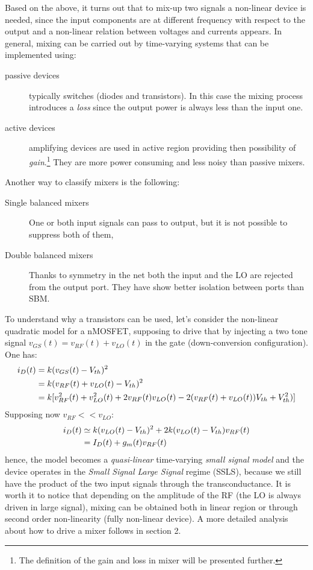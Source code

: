 Based on the above, it turns out that to mix-up two signals a non-linear device is needed, since the input components are at different frequency with respect to the output and a non-linear relation between voltages and currents appears. In general, mixing can be carried out by time-varying systems that can be implemented using:
\begin{description}
	\item [passive devices]	typically switches (diodes and transistors). In this case the mixing process introduces a \emph{loss} since the output power is always less than the input one.
	\item [active devices] amplifying devices are used in active region providing then possibility of \emph{gain}.\footnote{The definition of the gain and loss in mixer will be presented further.} They are more power consuming and less noisy than passive mixers.
\end{description}

Another way to classify mixers is the following:
\begin{description}
	\item [Single balanced mixers] One or both input signals can pass to output, but it is not possible to suppress both of them,
	\item [Double balanced mixers] Thanks to symmetry in the net both the input and the LO are rejected from the output port. They have show better isolation between ports than SBM. 
\end{description}
To understand why a transistors can be used, let's consider the non-linear quadratic model for a nMOSFET, supposing to drive that by injecting a two tone signal $v_{GS}(t)=v_{RF}(t)+v_{LO}(t)$ in the gate (down-conversion configuration). One has:
\begin{align}
i_D(t) &= k(v_{GS}(t)-V_{th})^2 \notag \\
& = k(v_{RF}(t)+v_{LO}(t)-V_{th})^2 \notag \\
& = k[v_{RF}^2(t)+v_{LO}^2(t)+2v_{RF}(t)v_{LO}(t)-2(v_{RF}(t)+v_{LO}(t))V_{th}+V_{th}^2)] \notag
\end{align}
Supposing now $v_{RF}<<v_{LO}$:
\begin{align}
i_D(t) &\simeq k(v_{LO}(t)-V_{th})^2+2k(v_{LO}(t)-V_{th})v_{RF}(t) \notag  \\
& = I_D(t)+g_m(t)v_{RF}(t) \notag
\end{align}
hence, the model becomes a \emph{quasi-linear} time-varying \emph{small signal model} and the device operates in the \emph{Small Signal Large Signal} regime (SSLS), because we still have the product of the two input signals through the transconductance. It is worth it to notice that depending on the amplitude of the RF (the LO is always driven in large signal), mixing can be obtained both in linear region or through second order non-linearity (fully non-linear device).
A more detailed analysis about how to drive a mixer follows in section 2.

